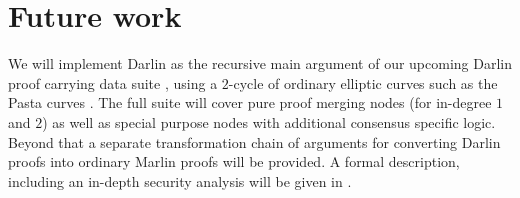 \documentclass[10pt,article,oneside]{memoir}
\theoremstyle{definition}
\theoremstyle{remark}
\begin{document}
\chapter{Future work}

We will implement Darlin as the recursive main argument of our upcoming Darlin proof carrying data suite \cite{DarlinFullProtocol}, using a $2$-cycle of ordinary elliptic curves such as the Pasta curves \cite{PastaCurves}.
The full suite will cover pure proof merging nodes (for in-degree $1$ and $2$) as well as special purpose nodes with additional consensus specific logic. 
Beyond that a separate transformation chain of arguments for converting Darlin proofs into ordinary Marlin proofs will be provided.
A formal description, including an in-depth security analysis will be given in \cite{DarlinFullProtocol}.


\end{document}
